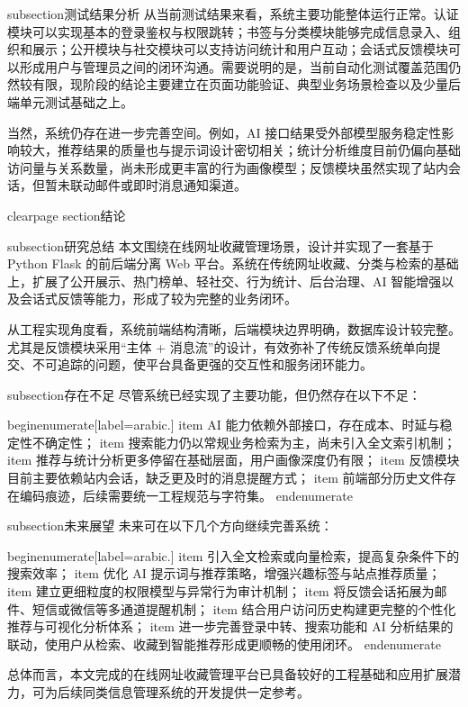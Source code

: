 subsection{测试结果分析}
从当前测试结果来看，系统主要功能整体运行正常。认证模块可以实现基本的登录鉴权与权限跳转；书签与分类模块能够完成信息录入、组织和展示；公开模块与社交模块可以支持访问统计和用户互动；会话式反馈模块可以形成用户与管理员之间的闭环沟通。需要说明的是，当前自动化测试覆盖范围仍然较有限，现阶段的结论主要建立在页面功能验证、典型业务场景检查以及少量后端单元测试基础之上。

当然，系统仍存在进一步完善空间。例如，AI 接口结果受外部模型服务稳定性影响较大，推荐结果的质量也与提示词设计密切相关；统计分析维度目前仍偏向基础访问量与关系数量，尚未形成更丰富的行为画像模型；反馈模块虽然实现了站内会话，但暂未联动邮件或即时消息通知渠道。

clearpage
section{结论}

subsection{研究总结}
本文围绕在线网址收藏管理场景，设计并实现了一套基于 Python Flask 的前后端分离 Web 平台。系统在传统网址收藏、分类与检索的基础上，扩展了公开展示、热门榜单、轻社交、行为统计、后台治理、AI 智能增强以及会话式反馈等能力，形成了较为完整的业务闭环。

从工程实现角度看，系统前端结构清晰，后端模块边界明确，数据库设计较完整。尤其是反馈模块采用“主体 + 消息流”的设计，有效弥补了传统反馈系统单向提交、不可追踪的问题，使平台具备更强的交互性和服务闭环能力。

subsection{存在不足}
尽管系统已经实现了主要功能，但仍然存在以下不足：

begin{enumerate}[label=arabic.]
    item AI 能力依赖外部接口，存在成本、时延与稳定性不确定性；
    item 搜索能力仍以常规业务检索为主，尚未引入全文索引机制；
    item 推荐与统计分析更多停留在基础层面，用户画像深度仍有限；
    item 反馈模块目前主要依赖站内会话，缺乏更及时的消息提醒方式；
    item 前端部分历史文件存在编码痕迹，后续需要统一工程规范与字符集。
end{enumerate}

subsection{未来展望}
未来可在以下几个方向继续完善系统：

begin{enumerate}[label=arabic.]
    item 引入全文检索或向量检索，提高复杂条件下的搜索效率；
    item 优化 AI 提示词与推荐策略，增强兴趣标签与站点推荐质量；
    item 建立更细粒度的权限模型与异常行为审计机制；
    item 将反馈会话拓展为邮件、短信或微信等多通道提醒机制；
    item 结合用户访问历史构建更完整的个性化推荐与可视化分析体系；
    item 进一步完善登录中转、搜索功能和 AI 分析结果的联动，使用户从检索、收藏到智能推荐形成更顺畅的使用闭环。
end{enumerate}

总体而言，本文完成的在线网址收藏管理平台已具备较好的工程基础和应用扩展潜力，可为后续同类信息管理系统的开发提供一定参考。

